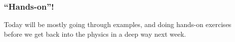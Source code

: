 \documentclass[hyperref={colorlinks=true}]{beamer}
\begin{document}

\begin{frame}%
  \frametitle{``Hands-on''!}
  
  Today will be mostly going through examples, and doing hands-on exercises before we get back into the physics in a deep way next week.

\end{frame}






%
%
%  

\end{document}
